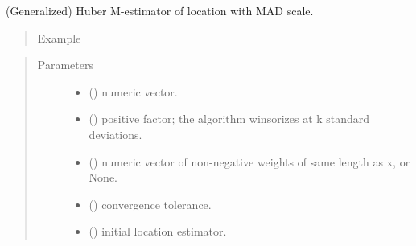 \documentclass[letterpaper,10pt,english]{sphinxmanual}
\begin{document}
\begin{fulllineitems}
\label{\detokenize{_modules/lmrob:lmrob.utils.huberM}}
(Generalized) Huber M-estimator of location with MAD scale.
\begin{quote}\begin{description}
\item[{Example}] \leavevmode
\end{description}\end{quote}

%
\begin{sphinxVerbatim}[commandchars=\\\{\}]
\PYG{p}{[}\PYG{p}{]}
\end{sphinxVerbatim}
\begin{quote}\begin{description}
\item[{Parameters}] \leavevmode\begin{itemize}
\item {} 
 () \textendash{} numeric vector.

\item {} 
 () \textendash{} positive factor; the algorithm winsorizes at k standard deviations.

\item {} 
 () \textendash{} numeric vector of non-negative weights of same length as x, or None.

\item {} 
 () \textendash{} convergence tolerance.

\item {} 
 () \textendash{} initial location estimator.


\end{itemize}
\end{description}
\end{quote}
\end{fulllineitems}
\end{document}
